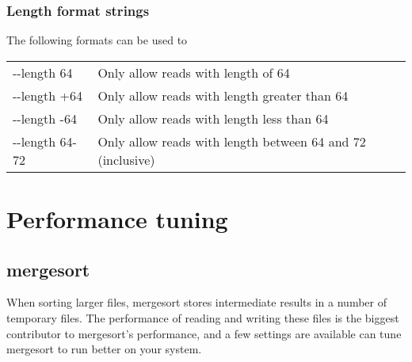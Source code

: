 \documentclass[11pt]{article}
\begin{document}
\subsubsection{Length format strings}
The following formats can be used to 
\begin{center}
\begin{tabular}{lp{3.5in}}
{-}{-}length 64&Only allow reads with length of 64\\
{-}{-}length +64&Only allow reads with length greater than 64\\
{-}{-}length -64&Only allow reads with length less than 64\\
{-}{-}length 64-72&Only allow reads with length between 64 and 72 (inclusive)\\
\end{tabular}
\end{center}

\section {Performance tuning}

\subsection {mergesort}
\label{mergesort_tuning}
When sorting larger files, mergesort stores intermediate results in a number of temporary files. The performance of reading and writing these files is the biggest contributor to mergesort's performance, and a few settings are available can tune mergesort to run better on your system.
\end{document}
